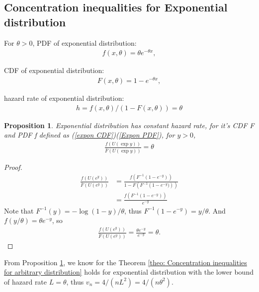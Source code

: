\documentclass{article}
\theoremstyle{plain}
\newtheorem{prop}{Proposition}
\begin{document}
\subsection{Concentration inequalities for Exponential distribution}



For $\theta > 0$, PDF of exponential distribution:
\begin{align}
\label{Expon PDF}
    f(x, \theta) = \theta e^{-\theta x},
\end{align}

CDF of exponential distribution:
\begin{align}
\label{expon CDF}
    F(x, \theta) = 1 - e^{-\theta x},
\end{align}

hazard rate of exponential distribution:
\begin{align}
 h = f(x, \theta)/ (1-F(x, \theta)) = \theta
\end{align}


\begin{prop}
\label{prop: hazard rate bound for exp}
Exponential distribution has constant hazard rate, for it's CDF F and PDF f defined as (\ref{expon CDF})(\ref{Expon PDF}), for $y > 0$,
\begin{align}
    \frac{f(U(\exp{y}))}{\bar{F}(U(\exp{y}))} = \theta
\end{align}
\end{prop}

\begin{proof}
\begin{align}
    \frac{f(U(e^{y}))}{\bar{F}(U(e^{y}))} &=
    \frac{f(F^{-1}(1 - e^{-y}))}{1-F\left({F}^{-1}\left(1 - e^{-y})\right)\right)}\\
    &= \frac{f(F^{-1}(1 - e^{-y}))}{e^{-y}}
\end{align}
Note that $F^{-1}(y) = - \log (1 - y)/ \theta$, thus $F^{-1}(1 - e^{-y}) = y/ \theta$. And $f(y/\theta) = \theta e^{-y}$,
so 
\begin{align}
    \frac{f(U(e^{y}))}{\bar{F}(U(e^{y}))} = \frac{\theta e^{-y}}{e^{-y}} = \theta.
\end{align}
\end{proof}

From Proposition \ref{prop: hazard rate bound for exp}, we know for the Theorem \ref{theo: Concentration inequalities for arbitrary distribution} holds for exponential distribution with the lower bound of hazard rate $L = \theta$, thus $v_n = 4/(nL^2) =  4/(n \theta^2)$.
\end{document}
